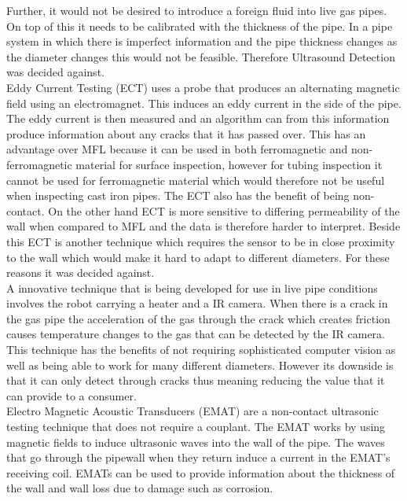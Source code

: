 \documentclass[11pt]{article}		%
\begin{document}
        Further, it would not be desired to introduce a foreign fluid into live gas pipes. 
        On top of this it needs to be calibrated with the thickness of the pipe. 
        In a pipe system in which there is imperfect information and the pipe thickness changes as the diameter changes this would not be feasible. 
        Therefore Ultrasound Detection was decided against.
        \\
        Eddy Current Testing (ECT) uses a probe that produces an alternating magnetic field using an electromagnet.
        This induces an eddy current in the side of the pipe. 
        The eddy current is then measured and an algorithm can from this information produce information about any cracks that it has passed over. 
        This has an advantage over MFL because it can be used in both ferromagnetic and non-ferromagnetic material for surface inspection, however for tubing inspection it cannot be used for ferromagnetic material which would therefore not be useful when inspecting cast iron pipes.
        The ECT  also has the benefit of being non-contact.
        On the other hand ECT is more sensitive to differing permeability of the wall when compared to MFL and the data is therefore harder to interpret. %
        Beside this ECT is another technique which requires the sensor to be in close proximity to the wall which would make it hard to adapt to different diameters. 
        For these reasons it was decided against.
        \\
        A innovative technique that is being developed for use in live pipe conditions involves the robot carrying a heater and a IR camera. 
        When there is a crack in the gas pipe the acceleration of the gas through the crack which creates friction causes temperature changes to the gas that can be detected by the IR camera. 
        This technique has the benefits of not requiring sophisticated computer vision as well as being able to work for many different diameters. 
        However its downside is that it can only detect through cracks thus meaning reducing the value that it can provide to a consumer. 
        \\
        Electro Magnetic Acoustic Transducers (EMAT) are a non-contact ultrasonic testing technique that does not require a couplant. 
        The EMAT works by using magnetic fields to induce ultrasonic waves into the wall of the pipe.
        The waves that go through the pipewall when they return induce a current in the EMAT’s receiving coil.
        EMATs can be used to provide information about the thickness of the wall and wall loss due to damage such as corrosion. 
\end{document}
